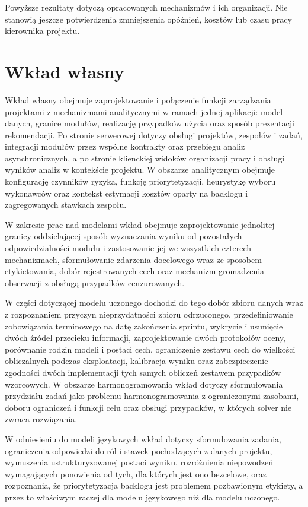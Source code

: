 Powyższe rezultaty dotyczą opracowanych mechanizmów i ich organizacji. Nie stanowią jeszcze potwierdzenia zmniejszenia opóźnień, kosztów lub czasu pracy kierownika projektu.

\section{Wkład własny}

Wkład własny obejmuje zaprojektowanie i połączenie funkcji zarządzania projektami z mechanizmami analitycznymi w ramach jednej aplikacji: model danych, granice modułów, realizację przypadków użycia oraz sposób prezentacji rekomendacji. Po stronie serwerowej dotyczy obsługi projektów, zespołów i zadań, integracji modułów przez wspólne kontrakty oraz przebiegu analiz asynchronicznych, a po stronie klienckiej widoków organizacji pracy i obsługi wyników analiz w kontekście projektu. W obszarze analitycznym obejmuje konfigurację czynników ryzyka, funkcję priorytetyzacji, heurystykę wyboru wykonawców oraz kontekst estymacji kosztów oparty na backlogu i zagregowanych stawkach zespołu.

W zakresie prac nad modelami wkład obejmuje zaprojektowanie jednolitej granicy oddzielającej sposób wyznaczania wyniku od pozostałych odpowiedzialności modułu i zastosowanie jej we wszystkich czterech mechanizmach, sformułowanie zdarzenia docelowego wraz ze sposobem etykietowania, dobór rejestrowanych cech oraz mechanizm gromadzenia obserwacji z obsługą przypadków cenzurowanych.

W części dotyczącej modelu uczonego dochodzi do tego dobór zbioru danych wraz z rozpoznaniem przyczyn nieprzydatności zbioru odrzuconego, przedefiniowanie zobowiązania terminowego na datę zakończenia sprintu, wykrycie i usunięcie dwóch źródeł przecieku informacji, zaprojektowanie dwóch protokołów oceny, porównanie rodzin modeli i postaci cech, ograniczenie zestawu cech do wielkości obliczalnych podczas eksploatacji, kalibracja wyniku oraz zabezpieczenie zgodności dwóch implementacji tych samych obliczeń zestawem przypadków wzorcowych. W obszarze harmonogramowania wkład dotyczy sformułowania przydziału zadań jako problemu harmonogramowania z ograniczonymi zasobami, doboru ograniczeń i funkcji celu oraz obsługi przypadków, w których solver nie zwraca rozwiązania.

W odniesieniu do modeli językowych wkład dotyczy sformułowania zadania, ograniczenia odpowiedzi do ról i stawek pochodzących z danych projektu, wymuszenia ustrukturyzowanej postaci wyniku, rozróżnienia niepowodzeń wymagających ponowienia od tych, dla których jest ono bezcelowe, oraz rozpoznania, że priorytetyzacja backlogu jest problemem pozbawionym etykiety, a przez to właściwym raczej dla modelu językowego niż dla modelu uczonego.

